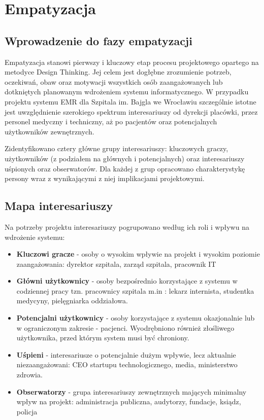 \chapter{Empatyzacja}

\section{Wprowadzenie do fazy empatyzacji}

Empatyzacja stanowi pierwszy i kluczowy etap procesu projektowego opartego na metodyce
Design Thinking. Jej celem jest dogłębne zrozumienie potrzeb, oczekiwań, obaw oraz
motywacji wszystkich osób zaangażowanych lub dotkniętych planowanym wdrożeniem systemu
informatycznego. W przypadku projektu systemu EMR dla Szpitala im. Bajgla we Wrocławiu
szczególnie istotne jest uwzględnienie szerokiego spektrum interesariuszy od dyrekcji
placówki, przez personel medyczny i techniczny, aż po pacjentów oraz potencjalnych
użytkowników zewnętrznych.

Zidentyfikowano cztery
główne grupy interesariuszy: kluczowych graczy, użytkowników (z podziałem na głównych i potencjalnych) oraz interesariuszy uśpionych oraz obserwatorów. Dla każdej z grup
opracowano charakterystykę persony wraz z wynikającymi z niej implikacjami projektowymi.

\section{Mapa interesariuszy}

Na potrzeby projektu interesariuszy pogrupowano według ich roli i wpływu na wdrożenie systemu:

\begin{itemize}
    \item \textbf{Kluczowi gracze} - osoby o wysokim wpływie na projekt i wysokim poziomie zaangażowania: dyrektor szpitala, zarząd szpitala, pracownik IT
    \item \textbf{Główni użytkownicy} - osoby bezpośrednio korzystające z systemu w codziennej pracy tzn. pracownicy szpitala m.in : lekarz internista, studentka medycyny, pielęgniarka oddziałowa.
    \item \textbf{Potencjalni użytkownicy} - osoby korzystające z systemu okazjonalnie lub w ograniczonym zakresie - pacjenci. Wyodrębniono również złośliwego użytkownika, przed którym system musi być chroniony.
    \item \textbf{Uśpieni} - interesariusze o potencjalnie dużym wpływie, lecz aktualnie niezaangażowani: CEO startupu technologicznego, media, ministerstwo zdrowia.
    \item \textbf{Obserwatorzy} - grupa interesariuszy zewnętrznych mających minimalny wpływ na projekt: administracja publiczna, audytorzy, fundacje, ksiądz, policja
\end{itemize}

